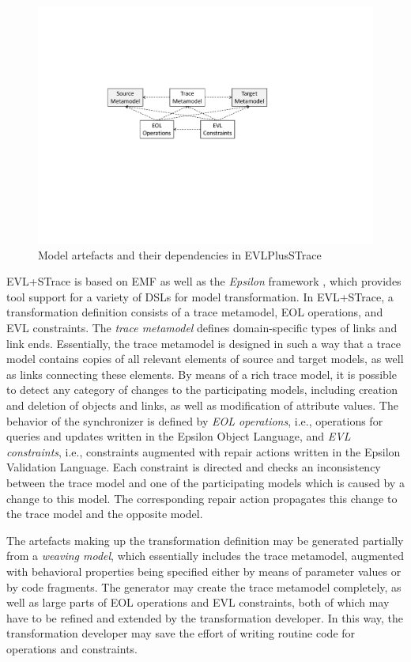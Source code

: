 \begin{figure}[tb!]
	\centering
	\includegraphics[width=0.8\columnwidth]{diagrams/EVLPlusSTraceArtefacts}
	\caption{Model artefacts and their dependencies in EVLPlusSTrace}
	\label{fig:evlartefacts}
\end{figure}

EVL+STrace is based on EMF as well as the \emph{Epsilon} framework \cite{epsilon}, which provides tool support for a variety of DSLs for model transformation. In EVL+STrace, a transformation definition consists of a trace metamodel, EOL operations, and EVL constraints. The \emph{trace metamodel} defines domain-specific types of links and link ends. Essentially, the trace metamodel is designed in such a way that a trace model contains copies of all relevant elements of source and target models, as well as links connecting these elements. By means of a rich trace model, it is possible to detect any category of changes to the participating models, including creation and deletion of objects and links, as well as modification of attribute values. The behavior of the synchronizer is defined by \emph{EOL operations}, i.e., operations for queries and updates written in the Epsilon Object Language, and \emph{EVL constraints}, i.e., constraints augmented with repair actions written in the Epsilon Validation Language. Each constraint is directed and checks an inconsistency between the trace model and one of the participating models which is caused by a change to this model. The corresponding repair action propagates this change to the trace model and the opposite model.

The artefacts making up the transformation definition may be generated partially from a \emph{weaving model}, which essentially includes the trace metamodel, augmented with behavioral properties being specified either by means of parameter values or by code fragments. The generator may create the trace metamodel completely, as well as large parts of EOL operations and EVL constraints, both of which may have to be refined and extended by the transformation developer. In this way, the transformation developer may save the effort of writing routine code for operations and constraints.

